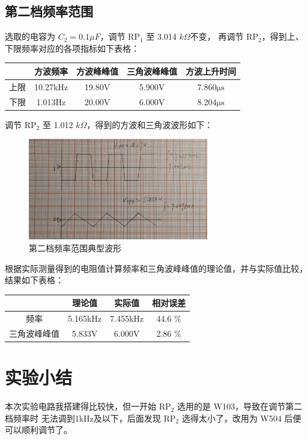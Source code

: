\documentclass[a4paper,11pt,UTF8]{article}
\begin{document}
\subsection{第二档频率范围}

选取的电容为 $C_2 = 0.1\mu F$，调节 RP$_1$ 至 3.014 $k\Omega$不变，
再调节 RP$_2$，得到上、下限频率对应的各项指标如下表格：

\begin{table}[H]
    \centering
    \begin{tabular}{|c|c|c|c|c|}
        \hline
         & 方波频率 & 方波峰峰值 & 三角波峰峰值 & 方波上升时间 \\
        \hline
        上限 & 10.27kHz & 19.80$\mathrm{V}$ & 5.900$\mathrm{V}$ & 7.860$\mathrm{\mu s}$ \\
        \hline
        下限 & 1.013Hz & 20.00$\mathrm{V}$ & 6.000$\mathrm{V}$ & 8.204$\mathrm{\mu s}$ \\
        \hline
    \end{tabular}
\end{table}

调节 RP$_2$ 至 1.012 $k\Omega$，得到的方波和三角波波形如下：

\begin{figure}
    \centering
    \includegraphics[width=0.7\textwidth]{3.5.jpg}
    \caption{第二档频率范围典型波形}
\end{figure}

根据实际测量得到的电阻值计算频率和三角波峰峰值的理论值，并与实际值比较，结果如下表格：

\begin{table}[H]
    \centering
    \begin{tabular}{|c|c|c|c|}
        \hline
         & 理论值 & 实际值 & 相对误差 \\
        \hline
        频率 & 5.165kHz & 7.455kHz & 44.6 \% \\
        \hline
        三角波峰峰值 & 5.833$\mathrm{V}$ & 6.000$\mathrm{V}$ & 2.86 \%\\
        \hline
    \end{tabular}
\end{table}

\section{实验小结}

本次实验电路我搭建得比较快，但一开始 RP$_2$ 选用的是 W103，导致在调节第二档频率时
无法调到1kHz及以下，后面发现 RP$_2$ 选得太小了，改用为 W504 后便可以顺利调节了。
\end{document}
